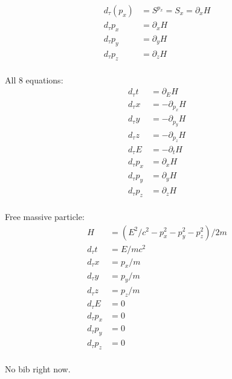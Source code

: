 \documentclass[twocolumn,floatfix,nofootinbib]{revtex4}   %
\theoremstyle{theorem}
\theoremstyle{definition}
\begin{document}
\begin{align*}
d_{\tau}(p_x) &= S^{p_x} = S_{x} = \partial_{x} H \\
d_{\tau}p_x &= \partial_{x} H \\
d_{\tau}p_y &= \partial_{y} H \\
d_{\tau}p_z &= \partial_{z} H \\
\end{align*}

All 8 equations:
\begin{align*}
d_{\tau}t &= \partial_{E} H \\
d_{\tau}x &= - \partial_{p_x} H \\
d_{\tau}y &= - \partial_{p_y} H \\
d_{\tau}z &= - \partial_{p_z} H \\
d_{\tau}E &= - \partial_{t} H \\
d_{\tau}p_x &= \partial_{x} H \\
d_{\tau}p_y &= \partial_{y} H \\
d_{\tau}p_z &= \partial_{z} H \\
\end{align*}

Free massive particle:
\begin{align*}
H &= (E^2/c^2 - p_x^2 - p_y^2 - p_z^2)/2m \\
d_{\tau}t &= E/mc^2 \\
d_{\tau}x &= p_x/m \\
d_{\tau}y &= p_y/m \\
d_{\tau}z &= p_z/m \\
d_{\tau}E &= 0 \\
d_{\tau}p_x &= 0 \\
d_{\tau}p_y &= 0 \\
d_{\tau}p_z &= 0 \\
\end{align*}


\begin{thebibliography}{5}

 No bib right now.

\end{thebibliography}
\end{document}
